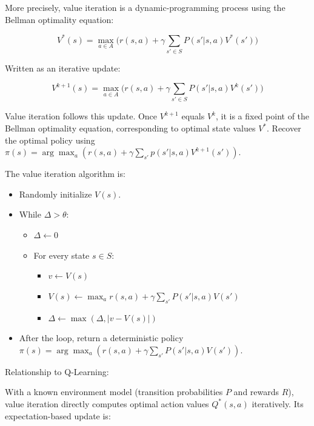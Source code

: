 More precisely, value iteration is a dynamic-programming process using the Bellman optimality equation:

\[
V^{*}(s)=\max_{a\in A}\bigl(r(s,a)+\gamma\sum_{s'\in S}P(s'|s,a)V^{*}(s')\bigr)
\]

Written as an iterative update:

\[
V^{k+1}(s)=\max_{a\in A}\bigl(r(s,a)+\gamma\sum_{s'\in S}P(s'|s,a)V^{k}(s')\bigr)
\]

Value iteration follows this update. Once \(V^{k+1}\) equals \(V^{k}\), it is a fixed point of the Bellman optimality equation, corresponding to optimal state values \(V^{*}\). Recover the optimal policy using \(\pi(s)=\arg\max_a(r(s,a)+\gamma\sum_{s'}p(s'|s,a)V^{k+1}(s'))\).

The value iteration algorithm is:

\begin{itemize}
\tightlist
\item
  Randomly initialize \(V(s)\).
\item
{}
  While \(\Delta>\theta\):

  \begin{itemize}
  \tightlist
  \item
    \(\Delta\leftarrow 0\)
  \item
{}
    For every state \(s\in S\):

    \begin{itemize}
    \tightlist
    \item
      \(v\leftarrow V(s)\)
    \item
      \(V(s)\leftarrow \max_a r(s,a)+\gamma\sum_{s'}P(s'|s,a)V(s')\)
    \item
      \(\Delta\leftarrow \max(\Delta,|v-V(s)|)\)
    \end{itemize}
  \end{itemize}
\item
  After the loop, return a deterministic policy \(\pi(s)=\arg\max_a(r(s,a)+\gamma\sum_{s'}P(s'|s,a)V(s'))\).
\end{itemize}

Relationship to Q-Learning:

With a known environment model (transition probabilities \(P\) and rewards \(R\)), value iteration directly computes optimal action values \(Q^{*}(s,a)\) iteratively. Its expectation-based update is:

